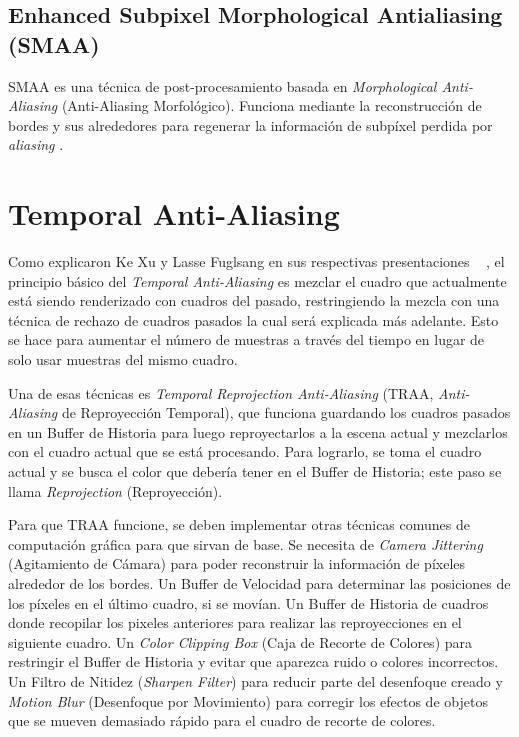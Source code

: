 \documentclass[pregrado]{tesis-usb} %
\begin{document}
\subsection{Enhanced Subpixel Morphological Antialiasing (SMAA)}
SMAA es una técnica de post-procesamiento basada en \textit{Morphological Anti-Aliasing} (Anti-Aliasing Morfológico). Funciona mediante la reconstrucción de bordes y sus alrededores para regenerar la información de subpíxel perdida por \textit{aliasing} \cite{Jimenez2012}.

\section{Temporal Anti-Aliasing}
Como explicaron Ke Xu y Lasse Fuglsang en sus respectivas presentaciones ~ \cite{XU2016, Fuglsand2016}, el principio básico del \textit{Temporal Anti-Aliasing} es mezclar el cuadro que actualmente está siendo renderizado con cuadros del pasado, restringiendo la mezcla con una técnica de rechazo de cuadros pasados la cual será explicada más adelante. Esto se hace para aumentar el número de muestras a través del tiempo en lugar de solo usar muestras del mismo cuadro.

Una de esas técnicas es \textit{Temporal Reprojection Anti-Aliasing}  (TRAA, \textit{Anti-Aliasing} de Reproyección Temporal), que funciona guardando los cuadros pasados en un Buffer de Historia para luego reproyectarlos a la escena actual y mezclarlos con el cuadro actual que se está procesando. Para lograrlo, se toma el cuadro actual y se busca el color que debería tener en el Buffer de Historia; este paso se llama \textit{Reprojection} (Reproyección).

Para que TRAA funcione, se deben implementar otras técnicas comunes de computación gráfica para que sirvan de base. Se necesita de \textit{Camera Jittering} (Agitamiento de Cámara) para poder reconstruir la información de píxeles alrededor de los bordes. Un Buffer de Velocidad para determinar las posiciones de los píxeles en el último cuadro, si se movían. Un Buffer de Historia de cuadros donde recopilar los pixeles anteriores para realizar las reproyecciones en el siguiente cuadro. Un \textit{Color Clipping Box} (Caja de Recorte de Colores) para restringir el Buffer de Historia y evitar que aparezca ruido o colores incorrectos. Un Filtro de Nitidez (\textit{Sharpen Filter}) para reducir parte del desenfoque creado y \textit{Motion Blur} (Desenfoque por Movimiento) para corregir los efectos de objetos que se mueven demasiado rápido para el cuadro de recorte de colores.
\end{document}
